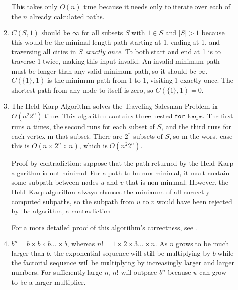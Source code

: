 \documentclass[a4paper, 10pt]{article}
\begin{document}
\begin{enumerate}
\begin{enumerate}
				This takes only $O(n)$ time because it needs only to iterate
				over each of the $n$ already calculated paths.

			\item $C(S, 1)$ should be $\infty$ for all subsets $S$ with $1 \in
				S$ and $|S| > 1$ because this would be the minimal length path
				starting at 1, ending at 1, and traversing all cities in $S$
				\textit{exactly once}. To both start and end at 1 is to traverse
				1 twice, making this input invalid. An invalid minimum path must
				be longer than any valid minimum path, so it should be $\infty$.
				$C(\{ 1 \}, 1)$ is the minimum path from 1 to 1, visiting 1
				exactly once. The shortest path from any node to itself is zero,
				so $C(\{ 1 \}, 1) = 0$.

			\item The Held--Karp Algorithm solves the Traveling Salesman Problem
				in $O(n^2 2^n)$ time. This algorithm contains three nested
				\texttt{for} loops. The first runs $n$ times, the second runs
				for each subset of $S$, and the third runs for each vertex in
				that subset. There are $2^n$ subsets of $S$, so in the worst
				case this is $O(n \times 2^n \times n)$, which is $O(n^2 2^n)$.

				Proof by contradiction: suppose that the path returned by the
				Held--Karp algorithm is not minimal. For a path to be
				non-minimal, it must contain some subpath between nodes $u$ and
				$v$ that is non-minimal. However, the Held--Karp algorithm
				always chooses the minimum of all correctly computed subpaths,
				so the subpath from $u$ to $v$ would have been rejected by the
				algorithm, a contradiction.

				For a more detailed proof of this algorithm's correctness, see
				\cite{held1962dynamic}.

			\item $b^n = b \times b \times b \dots \times b$, whereas $n! = 1
				\times 2 \times 3 \dots \times n$. As $n$ grows to be much
				larger than $b$, the exponential sequence will still be
				multiplying by $b$ while the factorial sequence will be
				multiplying by increasingly larger and larger numbers. For
				sufficiently large $n$, $n!$ will outpace $b^n$ because $n$ can
				grow to be a larger multiplier.
		\end{enumerate}
\end{enumerate}

\printbibliography
\end{document}

